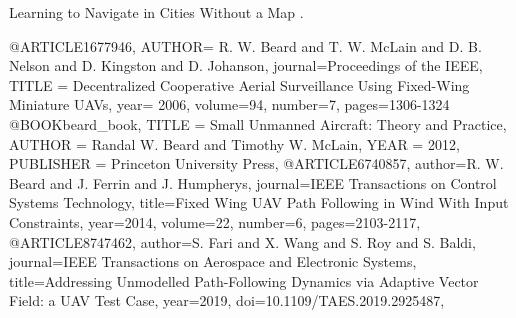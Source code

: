 \documentclass[UTF8]{ctexart}
\begin{document}
Learning to Navigate in Cities Without a Map \cite{mirowski2018learning}. 

@ARTICLE{1677946, 
	AUTHOR= {R. W. {Beard} and T. W. {McLain} and D. B. {Nelson} and D. {Kingston} and D. {Johanson}}, 
	journal={Proceedings of the IEEE}, 
	TITLE = {Decentralized Cooperative Aerial Surveillance Using Fixed-Wing Miniature {UAVs}}, 
	year= {2006}, 
	volume={94}, 
	number={7}, 
	pages={1306-1324}
}
@BOOK{beard_book,  
	TITLE = {Small Unmanned Aircraft: Theory and Practice},  
	AUTHOR = { Randal W. Beard and Timothy W. McLain},  
	YEAR = {2012},   
	PUBLISHER = {Princeton University Press},
}
@ARTICLE{6740857, 
	author={R. W. {Beard} and J. {Ferrin} and J. {Humpherys}}, 
	journal={IEEE Transactions on Control Systems Technology}, 
	title={Fixed Wing {UAV} Path Following in Wind With Input Constraints}, 
	year={2014}, 
	volume={22}, 
	number={6}, 
	pages={2103-2117}, 
}
@ARTICLE{8747462, 
	author={S. {Fari} and X. {Wang} and S. {Roy} and S. {Baldi}}, 
	journal={IEEE Transactions on Aerospace and Electronic Systems}, 
	title={Addressing Unmodelled Path-Following Dynamics via Adaptive Vector Field: a {UAV} Test Case},
	year={2019}, 
	doi={10.1109/TAES.2019.2925487}, 
}
\end{document}
